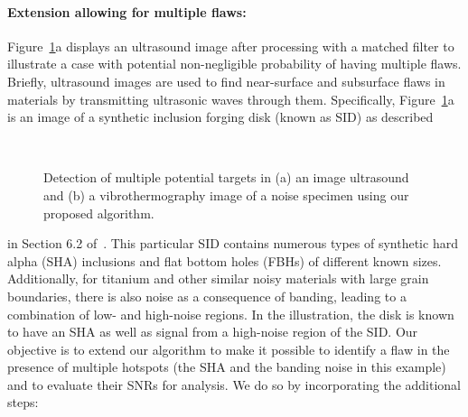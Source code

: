 \documentclass[12pt]{article}
\begin{document}
\paragraph{Extension allowing for multiple flaws:}
Figure~\ref{2targets}a displays an ultrasound image after processing
with a matched filter to illustrate a case with potential
non-negligible probability of having multiple flaws.
Briefly, ultrasound images are used to find near-surface and
subsurface flaws in materials by transmitting ultrasonic waves through
them. Specifically, Figure~\ref{2targets}a is an image of a 
synthetic inclusion forging disk (known as SID) as described 
\begin{figure}[h]
  \vspace{-0.1in}
\begin{center}
  \mbox{ 
    }
  \mbox{
  }
  \vspace{-0.15in}
  \caption{Detection of multiple potential targets in (a) an image
    ultrasound and (b) a vibrothermography image of a noise specimen
    using our proposed algorithm.}
  \label{2targets}
\end{center}
\vspace{-0.25in}
\end{figure}
in Section 6.2 of~\citet{margetanetal07}. This particular  SID
contains numerous types of synthetic  hard alpha (SHA) inclusions and
flat bottom holes (FBHs) of different known sizes. Additionally, for
titanium and other similar noisy materials with large grain
boundaries, there is also noise as a consequence of banding, leading
to a combination of low- and high-noise regions.  In the illustration,
the disk is known to have an  SHA as well as signal from a high-noise
region of the SID.
Our objective  is to extend our algorithm to make it
possible to identify a flaw in the presence of multiple hotspots 
(the  SHA and the banding noise in this example) and to evaluate their
SNRs for analysis. We do so by incorporating the additional steps:
\end{document}
